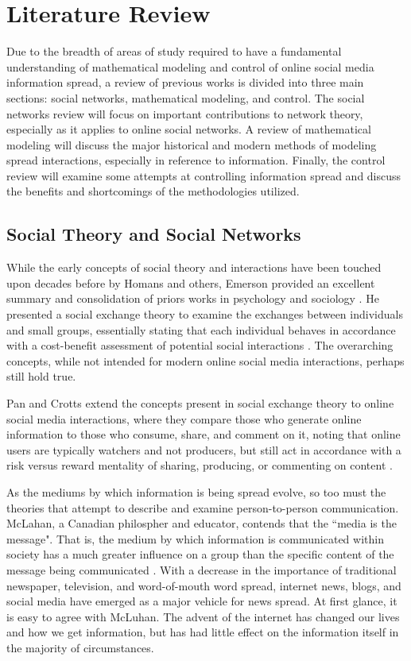 \chapter{Literature Review}%
Due to the breadth of areas of study required to have a fundamental understanding of mathematical modeling and control of online social media information spread, a review of previous works is divided into three main sections: social networks, mathematical modeling, and control. The social networks review will focus on important contributions to network theory, especially as it applies to online social networks. A review of mathematical modeling will discuss the major historical and modern methods of modeling spread interactions, especially in reference to information. Finally, the control review will examine some attempts at controlling information spread and discuss the benefits and shortcomings of the methodologies utilized.

\section{Social Theory and Social Networks}
While the early concepts of social theory and interactions have been touched upon decades before by Homans and others, Emerson provided an excellent summary and consolidation of priors works in psychology and sociology \cite{homans1958social}. He presented a social exchange theory to examine the exchanges between individuals and small groups, essentially stating that each individual behaves in accordance with a cost-benefit assessment of potential social interactions \cite{emerson1976social}. The overarching concepts, while not intended for modern online social media interactions, perhaps still hold true.

Pan and Crotts extend the concepts present in social exchange theory to online social media interactions, where they compare those who generate online information to those who consume, share, and comment on it, noting that online users are typically watchers and not producers, but still act in accordance with a risk versus reward mentality of sharing, producing, or commenting on content \cite{sigala2012social}. 

As the mediums by which information is being spread evolve, so too must the theories that attempt to describe and examine person-to-person communication. McLahan, a Canadian philospher and educator, contends that the ``media is the message". That is, the medium by which information is communicated within society has a much greater influence on a group than the specific content of the message being communicated \cite{mcluhan1995media}. With a decrease in the importance of traditional newspaper, television, and word-of-mouth word spread, internet news, blogs, and social media have emerged as a major vehicle for news spread. At first glance, it is easy to agree with McLuhan. The advent of the internet has changed our lives and how we get information, but has had little effect on the information itself in the majority of circumstances. 

